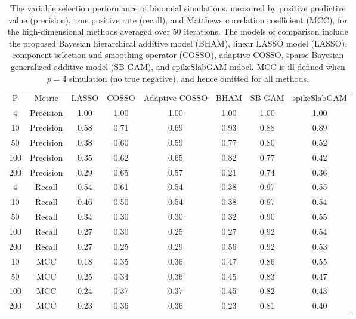 \begin{table}[ht]
\centering
\begin{tabular}{cccccccc}
 P & Metric & LASSO & COSSO & Adaptive COSSO & BHAM & SB-GAM & spikeSlabGAM \\ 
   4 & Precision & 1.00 & 1.00 & 1.00 & 1.00 & 1.00 & 1.00 \\ 
   10 & Precision & 0.58 & 0.71 & 0.69 & 0.93 & 0.88 & 0.89 \\ 
   50 & Precision & 0.38 & 0.60 & 0.59 & 0.77 & 0.80 & 0.52 \\ 
  100 & Precision & 0.35 & 0.62 & 0.65 & 0.82 & 0.77 & 0.42 \\ 
  200 & Precision & 0.29 & 0.65 & 0.57 & 0.21 & 0.74 & 0.36 \\ 
   \hline
  4 & Recall & 0.54 & 0.61 & 0.54 & 0.38 & 0.97 & 0.55 \\ 
   10 & Recall & 0.46 & 0.50 & 0.54 & 0.38 & 0.97 & 0.54 \\ 
   50 & Recall & 0.34 & 0.30 & 0.30 & 0.32 & 0.90 & 0.55 \\ 
  100 & Recall & 0.27 & 0.30 & 0.25 & 0.27 & 0.92 & 0.54 \\ 
  200 & Recall & 0.27 & 0.25 & 0.29 & 0.56 & 0.92 & 0.53 \\ 
   \hline
 10 & MCC & 0.18 & 0.35 & 0.36 & 0.47 & 0.86 & 0.55 \\ 
   50 & MCC & 0.25 & 0.34 & 0.36 & 0.45 & 0.83 & 0.47 \\ 
  100 & MCC & 0.24 & 0.37 & 0.37 & 0.45 & 0.82 & 0.43 \\ 
  200 & MCC & 0.23 & 0.36 & 0.36 & 0.23 & 0.81 & 0.40 \\ 
  \end{tabular}
\caption{The variable selection performance of binomial simulations,
                         measured by positive predictive value (precision), true positive rate (recall),
                         and Matthews correlation coefficient (MCC), for the high-dimensional methods 
                         averaged over 50 iterations. The models of comparison include the proposed Bayesian
                         hierarchical additive model (BHAM), linear LASSO model (LASSO), component selection and
                         smoothing operator (COSSO), adaptive COSSO, sparse Bayesian generalized additive model (SB-GAM),
                         and spikeSlabGAM mdoel. MCC is ill-defined when $p=4$ simulation (no true negative), and hence omitted for all methods.} 
\label{tab:sim_binom_var_select}
\end{table}
